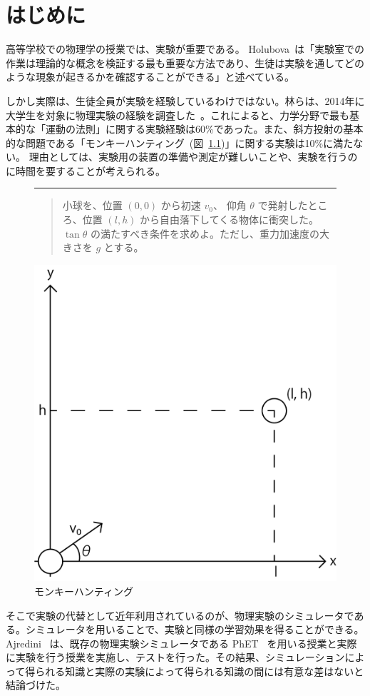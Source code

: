 \chapter{はじめに} \label{intro}

高等学校での物理学の授業では、実験が重要である。
Holubova~\cite{holubova_2019}は「実験室での作業は理論的な概念を検証する最も重要な方法であり、生徒は実験を通してどのような現象が起きるかを確認することができる」と述べている。

しかし実際は、生徒全員が実験を経験しているわけではない。林らは、2014年に大学生を対象に物理実験の経験を調査した~\cite{2015KJ00010038066}。これによると、力学分野で最も基本的な「運動の法則」に関する実験経験は60\%であった。また、斜方投射の基本的な問題である「モンキーハンティング~(図~\ref{monkey_hunting})」に関する実験は10\%に満たない。
理由としては、実験用の装置の準備や測定が難しいことや、実験を行うのに時間を要することが考えられる。

\begin{figure}[htb]
\noindent\rule{\linewidth}{0.4pt}
\begin{quote}
小球を、位置 $(0, 0)$ から初速 $v_0$、 仰角 $\theta$ で発射したところ、位置 $(l, h)$ から自由落下してくる物体に衝突した。 $\tan \theta$ の満たすべき条件を求めよ。ただし、重力加速度の大きさを $g$ とする。
\end{quote}
\centering
\includegraphics[width=0.3\linewidth]{work/monkey_hunting.png}
\caption{モンキーハンティング} \label{monkey_hunting}
\end{figure}

そこで実験の代替として近年利用されているのが、物理実験のシミュレータである。シミュレータを用いることで、実験と同様の学習効果を得ることができる。Ajredini~\cite{ajredini_real_2014} は、既存の物理実験シミュレータである PhET~\cite{perkins_phet_2006} を用いる授業と実際に実験を行う授業を実施し、テストを行った。その結果、シミュレーションによって得られる知識と実際の実験によって得られる知識の間には有意な差はないと結論づけた。


